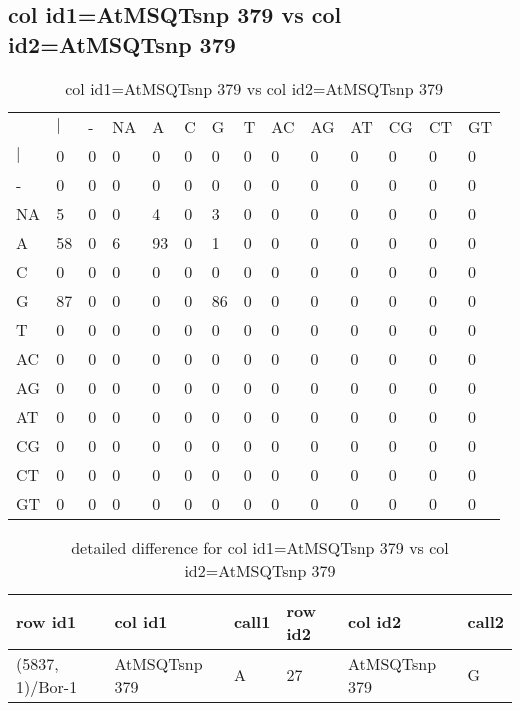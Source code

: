 \subsection{col id1=AtMSQTsnp 379 vs col id2=AtMSQTsnp 379}
\begin{center}
\begin{longtable}{|l|l|l|l|l|l|l|l|l|l|l|l|l|l|}
\caption{col id1=AtMSQTsnp 379 vs col id2=AtMSQTsnp 379} \label{table_dm896}\\
\hline
\\
\hline
&$|$&-&NA&A&C&G&T&AC&AG&AT&CG&CT&GT\\
$|$&0&0&0&0&0&0&0&0&0&0&0&0&0\\
-&0&0&0&0&0&0&0&0&0&0&0&0&0\\
NA&5&0&0&4&0&3&0&0&0&0&0&0&0\\
A&58&0&6&93&0&1&0&0&0&0&0&0&0\\
C&0&0&0&0&0&0&0&0&0&0&0&0&0\\
G&87&0&0&0&0&86&0&0&0&0&0&0&0\\
T&0&0&0&0&0&0&0&0&0&0&0&0&0\\
AC&0&0&0&0&0&0&0&0&0&0&0&0&0\\
AG&0&0&0&0&0&0&0&0&0&0&0&0&0\\
AT&0&0&0&0&0&0&0&0&0&0&0&0&0\\
CG&0&0&0&0&0&0&0&0&0&0&0&0&0\\
CT&0&0&0&0&0&0&0&0&0&0&0&0&0\\
GT&0&0&0&0&0&0&0&0&0&0&0&0&0\\
\hline
\end{longtable}
\end{center}

\begin{center}
\begin{longtable}{|l|l|l|l|l|l|}
\caption{detailed difference for col id1=AtMSQTsnp 379 vs col id2=AtMSQTsnp 379} \label{table_dm897}\\
\hline
row id1&col id1&call1&row id2&col id2&call2\\
\hline
(5837, 1)/Bor-1&AtMSQTsnp 379&A&27&AtMSQTsnp 379&G\\
\hline
\end{longtable}
\end{center}

